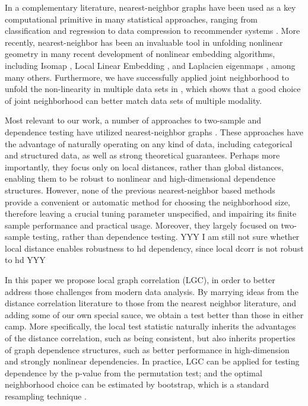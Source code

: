 \documentclass[11pt]{article}
\begin{document}
In a complementary literature, nearest-neighbor graphs have been used as a key computational primitive in many statistical approaches, ranging from classification and regression \cite{Stone1977} to data compression to recommender systems \cite{Sarwar2000}. 
More recently, nearest-neighbor has been an invaluable tool in unfolding nonlinear geometry in many recent development of nonlinear embedding algorithms, including Isomap \cite{TenenbaumSilvaLangford2000, SilvaTenenbaum2003}, Local Linear Embedding \cite{SaulRoweis2000, RoweisSaul2003}, and Laplacien eigenmaps \cite{BelkinNiyogi2003}, among many others. Furthermore, we have successfully applied joint neighborhood to unfold the non-linearity in multiple data sets in \cite{ShenVogelsteinPriebe2015}, which shows that a good choice of joint neighborhood can better match data sets of multiple modality. 



Most relevant to our work, a number of approaches to two-sample and dependence testing have utilized nearest-neighbor graphs \cite{David1966,Friedman1983,Schilling1986,Dumcke2014}.  These approaches have the advantage of naturally operating on any kind of data, including categorical and structured data, as well as strong theoretical guarantees.  Perhaps more importantly, they focus only on local distances, rather than global distances, enabling them to be robust to nonlinear and high-dimensional dependence structures.  However, none of the previous nearest-neighbor based methods provide a convenient or automatic method for choosing the neighborhood size, therefore leaving a crucial tuning parameter unspecified, and impairing its finite sample performance and practical usage. Moreover, they largely focused on two-sample testing, rather than dependence testing.  
YYY I am still not sure whether local distance enables robustness to hd dependency, since local dcorr is not robust to hd YYY



In this paper we propose local graph correlation (LGC), in order to better address those challenges from modern data analysis. By marrying ideas from the distance correlation literature to those from the nearest neighbor literature, and adding some of our own special sauce, we obtain a test better than those in either camp.  More specifically,  the local test statistic naturally inherits the advantages of the distance correlation, such as being consistent, but also inherits properties of graph dependence structures, such as better performance in high-dimension and strongly nonlinear dependencies. In practice, LGC can be applied for testing dependence by the p-value from the permutation test; and the optimal neighborhood choice can be estimated by bootstrap, which is a standard resampling technique \cite{EfronTibshiraniBook}.
\end{document}

